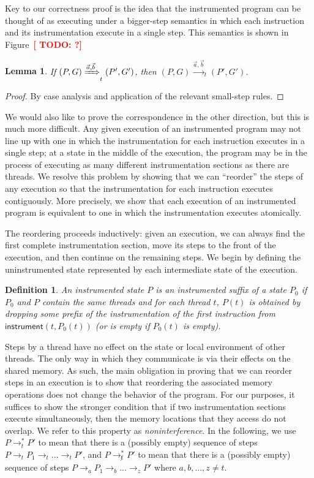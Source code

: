 \documentclass[preprint, 10pt]{sigplanconf}
\newcommand{\TODO}[1]{\textbf{\textcolor{red}{[ TODO: #1]}}}
\newcommand{\instr}[2]{\ensuremath{\mathsf{instrument}(#1, #2)}}
\newtheorem{lemma}{Lemma}
\newtheorem{definition}{Definition}
\begin{document}
Key to our correctness proof is the idea that the instrumented program can be thought of as executing under a bigger-step semantics in which each instruction and its instrumentation execute in a single step. This semantics is shown in Figure~\TODO{?}
\begin{lemma}\label{iexec-exec}If $(P, G) \xRightarrow{\vec{a}, \vec{b}}_t (P', G')$, then $(P, G) \xrightarrow{\vec{a}, \vec{b}}_t (P', G')$.\end{lemma}
\begin{proof}By case analysis and application of the relevant small-step rules.\end{proof}

We would also like to prove the correspondence in the other direction, but this is much more difficult. Any given execution of an instrumented program may not line up with one in which the instrumentation for each instruction executes in a single step; at a state in the middle of the execution, the program may be in the process of executing as many different instrumentation sections as there are threads. We resolve this problem by showing that we can ``reorder'' the steps of any execution so that the instrumentation for each instruction executes contiguously. More precisely, we show that each execution of an instrumented program is equivalent to one in which the instrumentation executes atomically.

The reordering proceeds inductively: given an execution, we can always find the first complete instrumentation section, move its steps to the front of the execution, and then continue on the remaining steps. We begin by defining the uninstrumented state represented by each intermediate state of the execution.
\begin{definition}An instrumented state $P$ is an \emph{instrumented suffix} of a state $P_0$ if $P_0$ and $P$ contain the same threads and for each thread $t$, $P(t)$ is obtained by dropping some prefix of the instrumentation of the first instruction from $\instr{t}{P_0(t)}$ (or is empty if $P_0(t)$ is empty).\end{definition}

Steps by a thread have no effect on the state or local environment of other threads. The only way in which they communicate is via their effects on the shared memory. As such, the main obligation in proving that we can reorder steps in an execution is to show that reordering the associated memory operations does not change the behavior of the program. For our purposes, it suffices to show the stronger condition that if two instrumentation sections execute simultaneously, then the memory locations that they access do not overlap. We refer to this property as \emph{noninterference}. In the following, we use $P \rightarrow^{*}_t P'$ to mean that there is a (possibly empty) sequence of steps $P \rightarrow_t P_1 \rightarrow_t ... \rightarrow_t P'$, and $P \rightarrow^{*}_{\not t} P'$ to mean that there is a (possibly empty) sequence of steps $P \rightarrow_a P_1 \rightarrow_b ... \rightarrow_z P'$ where $a, b, ..., z \neq t$.
\end{document}
